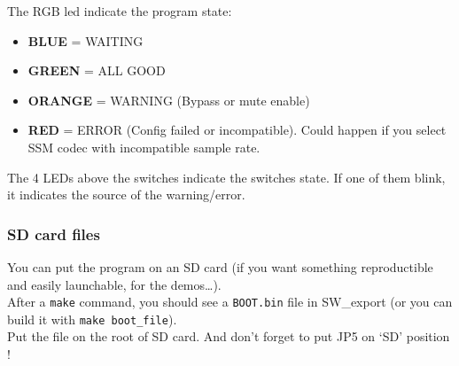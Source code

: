 The RGB led indicate the program state:

\begin{itemize}

\item
  \textbf{BLUE} = WAITING
\item
  \textbf{GREEN} = ALL GOOD
\item
  \textbf{ORANGE} = WARNING (Bypass or mute enable)
\item
  \textbf{RED} = ERROR (Config failed or incompatible). Could happen if
  you select SSM codec with incompatible sample rate.
\end{itemize}

The 4 LEDs above the switches indicate the switches state. If one of
them blink, it indicates the source of the warning/error.

\hypertarget{sd-card-files}{%
\subsubsection{SD card files}\label{sd-card-files}}

You can put the program on an SD card (if you want something
reproductible and easily launchable, for the demos\ldots).\\
After a \texttt{make} command, you should see a \texttt{BOOT.bin} file
in SW\_export (or you can build it with \texttt{make\ boot\_file}).\\
Put the file on the root of SD card. And don't forget to put JP5 on `SD'
position !







